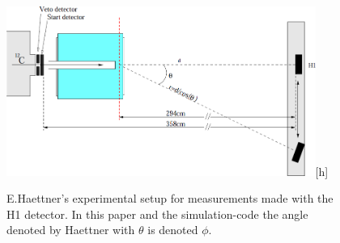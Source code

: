 \begin{figure}[!h] 
\begin{center}
\includegraphics[width=0.9\textwidth]{images/haettnersetup3.png}[h]  
\caption{\label{fig:haettnersetup3} E.Haettner's experimental setup for measurements made with the H1 detector. In this paper and the simulation-code the angle denoted by Haettner with $\theta$ is denoted $\phi$.}
 \end{center}
 \end{figure}


